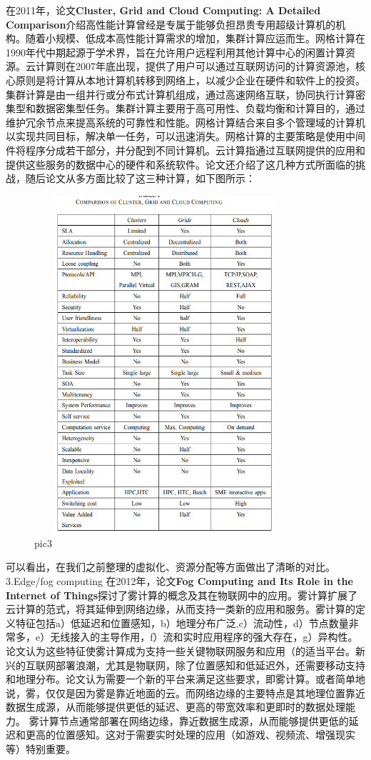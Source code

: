 \documentclass[a4paper,twoside]{scrbook}
\begin{document}
在2011年，论文\textbf{Cluster, Grid and Cloud Computing: A Detailed Comparison}介绍高性能计算曾经是专属于能够负担昂贵专用超级计算机的机构。随着小规模、低成本高性能计算需求的增加，集群计算应运而生。网格计算在1990年代中期起源于学术界，旨在允许用户远程利用其他计算中心的闲置计算资源。云计算则在2007年底出现，提供了用户可以通过互联网访问的计算资源池，核心原则是将计算从本地计算机转移到网络上，以减少企业在硬件和软件上的投资。集群计算是由一组并行或分布式计算机组成，通过高速网络互联，协同执行计算密集型和数据密集型任务。集群计算主要用于高可用性、负载均衡和计算目的，通过维护冗余节点来提高系统的可靠性和性能。网格计算结合来自多个管理域的计算机以实现共同目标，解决单一任务，可以迅速消失。网格计算的主要策略是使用中间件将程序分成若干部分，并分配到不同计算机。云计算指通过互联网提供的应用和提供这些服务的数据中心的硬件和系统软件。论文还介绍了这几种方式所面临的挑战，随后论文从多方面比较了这三种计算，如下图所示：
\begin{figure}
\centering %
\includegraphics[height=12.5cm,width=9.5cm]{c c g compaerd.png}
\caption{pic3}
\end{figure}
可以看出，在我们之前整理的虚拟化、资源分配等方面做出了清晰的对比。
3.Edge/fog computing
在2012年，论文\textbf{Fog Computing and Its Role in the Internet of Things}探讨了雾计算的概念及其在物联网中的应用。雾计算扩展了云计算的范式，将其延伸到网络边缘，从而支持一类新的应用和服务。雾计算的定义特征包括a）低延迟和位置感知，b）地理分布广泛,c）流动性，d）节点数量非常多，e）无线接入的主导作用，f）流和实时应用程序的强大存在，g）异构性。论文认为这些特征使雾计算成为支持一些关键物联网服务和应用（的适当平台。新兴的互联网部署浪潮，尤其是物联网，除了位置感知和低延迟外，还需要移动支持和地理分布。论文认为需要一个新的平台来满足这些要求，即雾计算。或者简单地说，雾，仅仅是因为雾是靠近地面的云。而网络边缘的主要特点是其地理位置靠近数据生成源，从而能够提供更低的延迟、更高的带宽效率和更即时的数据处理能力。
雾计算节点通常部署在网络边缘，靠近数据生成源，从而能够提供更低的延迟和更高的位置感知。这对于需要实时处理的应用（如游戏、视频流、增强现实等）特别重要。
\end{document}
